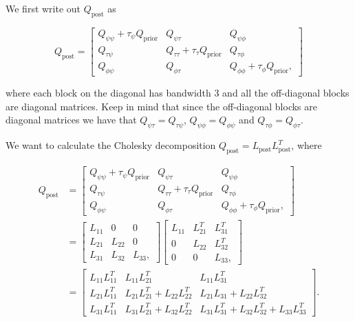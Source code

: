 \documentclass[
  letterpaper,
  DIV=11,
  numbers=noendperiod]{scrartcl}
\begin{document}
We first write out \(Q_\text{post}\) as

\[
Q_\text{post} = \begin{bmatrix}
Q_{\psi\psi} + \tau_\psi Q_\text{prior} & Q_{\psi\tau} & Q_{\psi\phi} \\
Q_{\tau\psi} & Q_{\tau\tau} + \tau_\tau Q_\text{prior} & Q_{\tau\phi} \\
Q_{\phi\psi} & Q_{\phi\tau} & Q_{\phi\phi} + \tau_\phi Q_\text{prior},
\end{bmatrix}
\]

where each block on the diagonal has bandwidth 3 and all the
off-diagonal blocks are diagonal matrices. Keep in mind that since the
off-diagonal blocks are diagonal matrices we have that
\(Q_{\psi\tau} = Q_{\tau\psi}\), \(Q_{\psi\phi} = Q_{\phi\psi}\) and
\(Q_{\tau\phi} = Q_{\phi\tau}\).

We want to calculate the Cholesky decomposition
\(Q_\text{post} = L_\text{post}L_\text{post}^T\), where

\[
\begin{aligned}
Q_\text{post} &= \begin{bmatrix}
Q_{\psi\psi} + \tau_\psi Q_\text{prior} & Q_{\psi\tau} & Q_{\psi\phi} \\
Q_{\tau\psi} & Q_{\tau\tau} + \tau_\tau Q_\text{prior} & Q_{\tau\phi} \\
Q_{\phi\psi} & Q_{\phi\tau} & Q_{\phi\phi} + \tau_\phi Q_\text{prior},
\end{bmatrix} \\
&=
\begin{bmatrix}
L_{11} & 0 & 0 \\
L_{21} & L_{22} & 0 \\
L_{31} & L_{32} & L_{33},
\end{bmatrix}
\begin{bmatrix}
L_{11} & L_{21}^T & L_{31}^T \\
0 & L_{22} & L_{32}^T \\
0 & 0 & L_{33},
\end{bmatrix} \\
&= \begin{bmatrix}
L_{11}L_{11}^T & L_{11}L_{21}^T & L_{11}L_{31}^T  \\
L_{21}L_{11}^T & L_{21}L_{21}^T + L_{22}L_{22}^T & L_{21}L_{31} + L_{22}L_{32}^T \\
L_{31}L_{11}^T & L_{31}L_{21}^T + L_{32}L_{22}^T & L_{31}L_{31}^T + L_{32}L_{32}^T + L_{33}L_{33}^T
\end{bmatrix}.
\end{aligned}
\]
\end{document}
